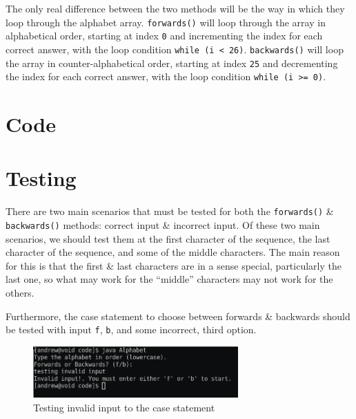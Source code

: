 \documentclass[11pt]{article}
\begin{document}
The only real difference between the two methods will be the way in which they loop through the alphabet array. 
\verb|forwards()| will loop through the array in alphabetical order, starting at index \verb|0| and incrementing the index for each correct answer, with the loop condition \verb|while (i < 26)|. 
\verb|backwards()| will loop the array in counter-alphabetical order, starting at index \verb|25| and decrementing the index for each correct answer, with the loop condition \verb|while (i >= 0)|. 


\section{Code}


\section{Testing}
There are two main scenarios that must be tested for both the \verb|forwards()| \& \verb|backwards()| methods: correct input \& incorrect input. 
Of these two main scenarios, we should test them at the first character of the sequence, the last character of the sequence, and some of the middle characters. 
The main reason for this is that the first \& last characters are in a sense special, particularly the last one, so what may work for the ``middle'' characters may not work for the others. 

Furthermore, the case statement to choose between forwards \& backwards should be tested with input \verb|f|, \verb|b|, and some incorrect, third option. 

\begin{center}
\begin{figure}[htp]
    \centering
    \includegraphics[width=0.7\textwidth]{invalid_input.png}
    \caption{Testing invalid input to the case statement}
\end{figure}
\end{center}
\end{document}
